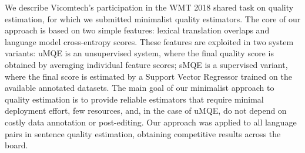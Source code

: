 We describe Vicomtech's participation in the WMT 2018 shared task on quality estimation, for which we submitted minimalist quality estimators. The core of our approach is based on two simple features: lexical translation overlaps and language model cross-entropy scores. These features are exploited in two system variants: uMQE is an unsupervised system, where the final quality score is obtained by averaging individual feature scores; sMQE is a supervised variant, where the final score is estimated by a Support Vector Regressor trained on the available annotated datasets. The main goal of our minimalist approach to quality estimation is to provide reliable estimators that require minimal deployment effort, few resources, and, in the case of uMQE, do not depend on costly data annotation or post-editing. Our approach was applied to all language pairs in sentence quality estimation, obtaining competitive results across the board.

